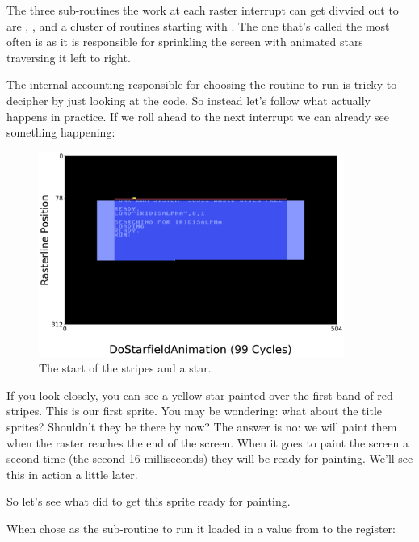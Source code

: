 The three sub-routines the work at each raster interrupt can get divvied out to are ,
, and a cluster of routines starting with . The one
that's called the most often is  as it is responsible for sprinkling the screen with 
animated stars traversing it left to right.

%


The internal accounting responsible for choosing the routine to run is tricky to decipher by just looking at the code. So
instead let's follow what actually happens in practice. If we roll ahead to the next interrupt we can already see something
happening:

\begin{figure}[H]
    \centering
      \includegraphics[width=10cm]{titlescreen/title3.png}%
\caption{The start of the stripes and a star.}
\end{figure}

If you look closely, you can see a yellow star painted over the first band of red stripes. This is our first sprite. You may
be wondering: what about the title sprites? Shouldn't they be there by now? The answer is no: we will paint them when the
raster reaches the end of the screen. When it goes to paint the screen a second time (the second 16 milliseconds) they
will be ready for painting. We'll see this in action a little later.

So let's see what  did to get this sprite ready for painting.

When  chose  as the sub-routine to run it loaded in a value
from  to the  register: 

